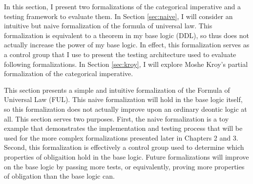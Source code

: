 %
\begin{isabellebody}%
%
%
\isadelimtheory
%
\endisadelimtheory
%
\isatagtheory
%
\endisatagtheory
{\isafoldtheory}%
%
\isadelimtheory
%
\endisadelimtheory
%
\isadelimdocument
%
\endisadelimdocument
%
\isatagdocument
%
\isamarkuptrue%
%
\endisatagdocument
{\isafolddocument}%
%
\isadelimdocument
%
\endisadelimdocument
%
\begin{isamarkuptext}%
In this section, I present two formalizations of the categorical imperative and a testing framework
to evaluate them. In Section \ref{sec:naive}, I will consider an intuitive but naive formalization of 
the formula of universal law. This formalization is equivalent to a theorem in my base logic (DDL), so 
thus does not actually increase the power of my base logic. In effect, this formalization serves as a control
group that I use to present the testing architecture used to evaluate following formalizations.
In Section \ref{sec:kroy}, I will explore Moshe Kroy's partial formalization of 
the categorical imperative.%
\end{isamarkuptext}\isamarkuptrue%
%
\isadelimdocument
%
\endisadelimdocument
%
\isatagdocument
%
\isamarkuptrue%
%
\endisatagdocument
{\isafolddocument}%
%
\isadelimdocument
%
\endisadelimdocument
%
\begin{isamarkuptext}%
This section presents a simple and intuitive formalization of the Formula of Universal Law (FUL). 
This naive formalization will hold in the base logic itself, so this formalization does not actually
improve upon an ordinary deontic logic at all. This section serves two purposes. First, the naive formalization
is a toy example that demonstrates the implementation and testing process that will be used for the more 
complex formalizations presented later in Chapters 2 and 3. Second, this formalization is effectively
a control group used to determine which properties of obligaition hold in the base logic. Future formalizations
will improve on the base logic by passing more tests, or equivalently, proving more properties of 
obligation than the base logic can.



\end{isamarkuptext}
\end{isabellebody}
